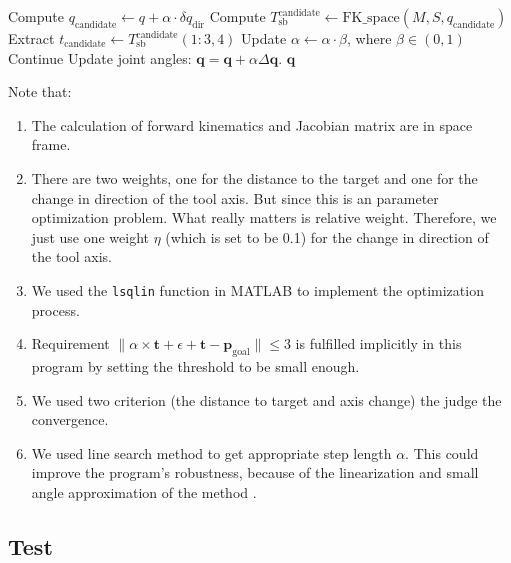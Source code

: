 \documentclass[english,10pt,a4paper]{book}
\begin{document}
\begin{algorithm}[H]
\begin{algorithmic}[1]
				\State Compute \(q_{\text{candidate}} \gets q + \alpha \cdot \delta q_{\text{dir}}\)
				\State Compute \(T_{\text{sb}}^{\text{candidate}} \gets \text{FK\_space}(M, S, q_{\text{candidate}})\)
				\State Extract \(t_{\text{candidate}} \gets T_{\text{sb}}^{\text{candidate}}(1:3, 4)\)
				\State Update \(\alpha \gets \alpha \cdot \beta\), where \(\beta \in (0, 1)\)
				\State Continue
				\EndIf
				\EndFor
				\State Update joint angles: \( \mathbf{q} = \mathbf{q} + \alpha \Delta \mathbf{q} \).
				\EndWhile
				\State \Return \( \mathbf{q} \)
				\EndFunction
			\end{algorithmic}
		\end{algorithm}
		Note that: \begin{enumerate}
			\item The calculation of forward kinematics and Jacobian matrix are in space frame.
			\item There are two weights, one for the distance to the target and one for the change in direction of the tool axis. But since this is an parameter optimization problem. What really matters is relative weight. Therefore, we just use one weight \(\eta\) (which is set to be 0.1) for the change in direction of the tool axis.
			\item We used the \texttt{lsqlin} function in MATLAB to implement the optimization process.
			\item Requirement \(\| \alpha \times \mathbf{t} + \epsilon + \mathbf{t} - \mathbf{p}_{\text{goal}} \| \leq 3\) is fulfilled implicitly in this program by setting the threshold to be small enough.
			\item We used two criterion (the distance to target and axis change) the judge the convergence.
			\item We used line search method to get appropriate step length $\alpha$. This could improve the program's robustness, because of the linearization and small angle approximation of the method \cite{nocedal2006numerical}. 
		\end{enumerate}
		\subsection{Test}
\end{document}
